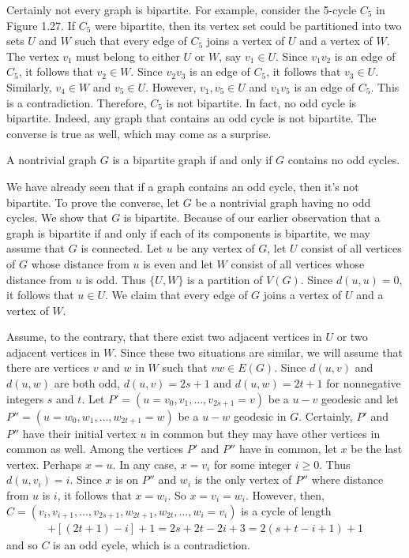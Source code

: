 Certainly not every graph is bipartite. For example, consider the 5-cycle $C_{5}$ in Figure 1.27. If $C_{5}$ were bipartite, then its vertex set could be partitioned into two sets $U$ and $W$ such that every edge of $C_{5}$ joins a vertex of $U$ and a vertex of $W$. The vertex $v_{1}$ must belong to either $U$ or $W$, say $v_{1} \in U$. Since $v_{1}v_{2}$ is an edge of $C_{5}$, it follows that $v_{2} \in W$. Since $v_{2}v_{3}$ is an edge of $C_{5}$, it follows that $v_{3} \in U$. Similarly, $v_{4} \in W$ and $v_{5} \in U$. However, $v_{1},v_{5} \in U$ and $v_{1}v_{5}$ is an edge of $C_{5}$. This is a contradiction. Therefore, $C_{5}$ is not bipartite. In fact, no odd cycle is bipartite. Indeed, any graph that contains an odd cycle is not bipartite. The converse is true as well, which may come as a surprise.




\begin{thm}
A nontrivial graph $G$ is a bipartite graph if and only if $G$ contains no odd cycles.
\end{thm}

\begin{pf}
We have already seen that if a graph contains an odd cycle, then it's not bipartite. To prove the converse, let $G$ be a nontrivial graph having no odd cycles. We show that $G$ is bipartite. Because of our earlier observation that a graph is bipartite if and only if each of its components is bipartite, we may assume that $G$ is connected. Let $u$ be any vertex of $G$, let $U$ consist of all vertices of $G$ whose distance from $u$ is even and let $W$ consist of all vertices whose distance from $u$ is odd. Thus $\{U,W\}$ is a partition of $V(G)$. Since $d(u,u)=0$, it follows that $u \in U$. We claim that every edge of $G$ joins a vertex of $U$ and a vertex of $W$.

Assume, to the contrary, that there exist two adjacent vertices in $U$ or two adjacent vertices in $W$. Since these two situations are similar, we will assume that there are vertices $v$ and $w$ in $W$ such that $vw \in E(G)$. Since $d(u,v)$ and $d(u,w)$ are both odd, $d(u,v) = 2s+1$ and $d(u,w) = 2t+1$ for nonnegative integers $s$ and $t$. Let $P' = (u = v_{0},v_{1},\ldots,v_{2s+1} = v)$ be a $u-v$ geodesic and let $P'' = (u = w_{0},w_{1},\ldots,w_{2t+1} = w)$ be a $u-w$ geodesic in $G$. Certainly, $P'$ and $P''$ have their initial vertex $u$ in common but they may have other vertices in common as well. Among the vertices $P'$ and $P''$ have in common, let $x$ be the last vertex. Perhaps $x = u$. In any case, $x = v_{i}$ for some integer $i \geq 0$. Thus $d(u,v_{i}) = i$. Since $x$ is on $P''$ and $w_{i}$ is the only vertex of $P''$ where distance from $u$ is $i$, it follows that $x = w_{i}$. So $x = v_{i} = w_{i}$. However, then, $C = (v_{i},v_{i+1},\ldots,v_{2s+1},w_{2t+1},w_{2t},\ldots,w_{i} = v_{i})$ is a cycle of length
\begin{align*}
[(2s+1)-i]+[(2t+1)-i]+1 = 2s+2t-2i+3 = 2(s+t-i+1)+1
\end{align*}
and so $C$ is an odd cycle, which is a contradiction.
\end{pf}

